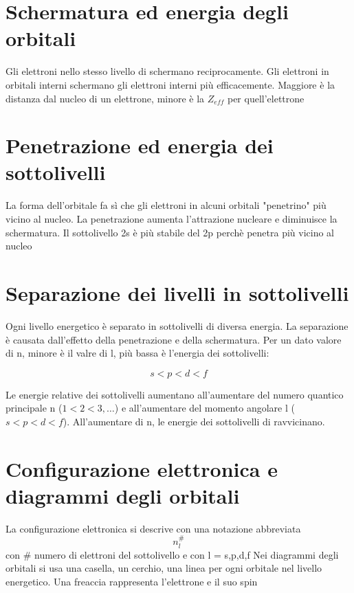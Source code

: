 \documentclass[a4paper,11pt]{report}
\begin{document}
\section{Schermatura ed energia degli orbitali}

Gli elettroni nello stesso livello di schermano reciprocamente. 
Gli elettroni in orbitali interni schermano gli elettroni interni più efficacemente.
Maggiore è la distanza dal nucleo di un elettrone, minore è la $Z_{eff}$ per quell'elettrone

\section{Penetrazione ed energia dei sottolivelli}

La forma dell'orbitale fa sì che gli elettroni in alcuni orbitali "penetrino" più vicino al nucleo.
La penetrazione aumenta l'attrazione nucleare e diminuisce la schermatura.
Il sottolivello 2s è più stabile del 2p perchè penetra più vicino al nucleo

\section{Separazione dei livelli in sottolivelli}

Ogni livello energetico è separato in sottolivelli di diversa energia.
La separazione è causata dall'effetto della penetrazione e della schermatura.
Per un dato valore di n, minore è il valre di l, più bassa è l'energia dei sottolivelli:

\begin{equation*}
	s < p < d < f
\end{equation*}

\noindent Le energie relative dei sottolivelli aumentano all'aumentare del numero quantico principale n ($1<2<3,\dots$) e all'aumentare del momento angolare l ($s<p<d<f$).
All'aumentare di n, le energie dei sottolivelli di ravvicinano.

\section{Configurazione elettronica e diagrammi degli orbitali}

La configurazione elettronica si descrive con una notazione abbreviata
\begin{equation*}
	n^\#_l
\end{equation*}
con \# numero di elettroni del sottolivello e con l = s,p,d,f \newline
Nei diagrammi degli orbitali si usa una casella, un cerchio, una linea per ogni orbitale nel livello energetico. Una freaccia rappresenta l'elettrone e il suo spin
\end{document}
